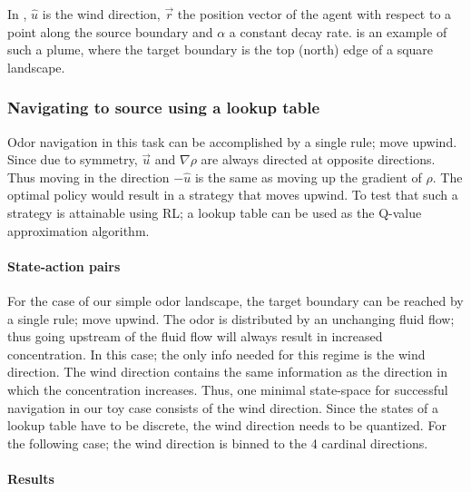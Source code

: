 \documentclass[../dissertation.tex]{subfiles}
\begin{document}
In , $\hat{u}$ is the wind direction, $\vec{r}$ the position vector of the agent with respect to a point along the source boundary and $\alpha$ a constant decay rate.
 is an example of such a plume, where the target boundary is the top (north) edge of a square landscape.

\subsubsection{Navigating to source using a lookup table}
\label{sec:lookupTable1d}

Odor navigation in this task can be accomplished by a single rule; move upwind.
Since due to symmetry, $\vec{u}$ and $\nabla \rho$ are always directed at opposite directions.
Thus moving in the direction $-\hat{u}$ is the same as moving up the gradient of $\rho$.
The optimal policy would result in a strategy that moves upwind.
To test that such a strategy is attainable using RL; a lookup table can be used as the Q-value approximation algorithm.

\paragraph{State-action pairs}

For the case of our simple odor landscape, the target boundary can be reached by a single rule; move upwind.
The odor is distributed by an unchanging fluid flow; thus going upstream of the fluid flow will always result in increased concentration.
In this case; the only info needed for this regime is the wind direction.
The wind direction contains the same information as the direction in which the concentration increases.
Thus, one minimal state-space for successful navigation in our toy case consists of the wind direction.
Since the states of a lookup table have to be discrete, the wind direction needs to be quantized.
For the following case; the wind direction is binned to the 4 cardinal directions.

\paragraph{Results}
\end{document}
